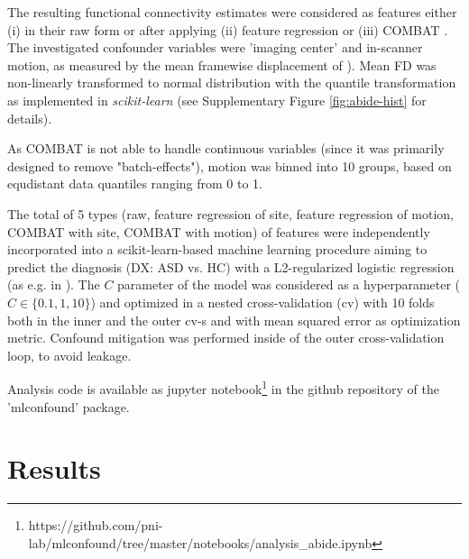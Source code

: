 \documentclass{article}
\begin{document}
The resulting functional connectivity estimates were considered as features either (i) in their raw form or after applying (ii) feature regression \citep{rao2017predictive} or (iii) COMBAT \citep{johnson2007adjusting, fortin2018harmonization}.
The investigated confounder variables were 'imaging center' and in-scanner motion, as measured by the mean framewise displacement of \cite{power2014methods}).
Mean FD was non-linearly transformed to normal distribution with the quantile transformation \citep{beasley2009rank} as implemented in \emph{scikit-learn} \citep{pedregosa2011scikit} (see Supplementary Figure \ref{fig:abide-hist} for details).

As COMBAT is not able to handle continuous variables (since it was primarily designed to remove "batch-effects"), motion was binned into 10 groups, based on equdistant data quantiles ranging from 0 to 1.

The total of 5 types (raw, feature regression of site, feature regression of motion, COMBAT with site, COMBAT with motion) of features were independently incorporated into a scikit-learn-based \citep{pedregosa2011scikit} machine learning procedure aiming to predict the diagnosis (DX: ASD vs. HC) with a L2-regularized logistic regression (as e.g. in \citep{dadi2019benchmarking}). The $C$ parameter of the model was considered as a hyperparameter ($C \in \{0.1, 1, 10\}$) and optimized in a nested cross-validation (cv) with 10 folds both in the inner and the outer cv-s and with mean squared error as optimization metric. Confound mitigation was performed inside of the outer cross-validation loop, to avoid leakage.

Analysis code is available as jupyter notebook\footnote{https://github.com/pni-lab/mlconfound/tree/master/notebooks/analysis\_abide.ipynb} in the github repository of the 'mlconfound' package.

\section{Results}
\end{document}
